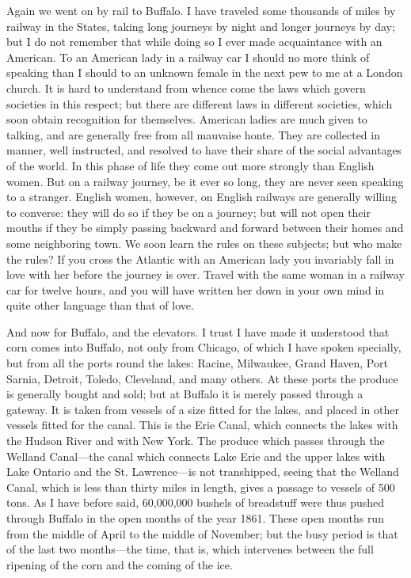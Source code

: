 Again we went on by rail to Buffalo.  I have traveled some
thousands of miles by railway in the States, taking long journeys
by night and longer journeys by day; but I do not remember that
while doing so I ever made acquaintance with an American.  To an
American lady in a railway car I should no more think of speaking
than I should to an unknown female in the next pew to me at a
London church.  It is hard to understand from whence come the laws
which govern societies in this respect; but there are different
laws in different societies, which soon obtain recognition for
themselves.  American ladies are much given to talking, and are
generally free from all mauvaise honte.  They are collected in
manner, well instructed, and resolved to have their share of the
social advantages of the world.  In this phase of life they come
out more strongly than English women.  But on a railway journey, be
it ever so long, they are never seen speaking to a stranger.
English women, however, on English railways are generally willing
to converse: they will do so if they be on a journey; but will not
open their mouths if they be simply passing backward and forward
between their homes and some neighboring town.  We soon learn the
rules on these subjects; but who make the rules?  If you cross the
Atlantic with an American lady you invariably fall in love with her
before the journey is over.  Travel with the same woman in a
railway car for twelve hours, and you will have written her down in
your own mind in quite other language than that of love.

And now for Buffalo, and the elevators.  I trust I have made it
understood that corn comes into Buffalo, not only from Chicago, of
which I have spoken specially, but from all the ports round the
lakes: Racine, Milwaukee, Grand Haven, Port Sarnia, Detroit,
Toledo, Cleveland, and many others.  At these ports the produce is
generally bought and sold; but at Buffalo it is merely passed
through a gateway.  It is taken from vessels of a size fitted for
the lakes, and placed in other vessels fitted for the canal.  This
is the Erie Canal, which connects the lakes with the Hudson River
and with New York.  The produce which passes through the Welland
Canal---the canal which connects Lake Erie and the upper lakes with
Lake Ontario and the St. Lawrence---is not transhipped, seeing that
the Welland Canal, which is less than thirty miles in length, gives
a passage to vessels of 500 tons.  As I have before said,
60,000,000 bushels of breadstuff were thus pushed through Buffalo
in the open months of the year 1861.  These open months run from
the middle of April to the middle of November; but the busy period
is that of the last two months---the time, that is, which intervenes
between the full ripening of the corn and the coming of the ice.

